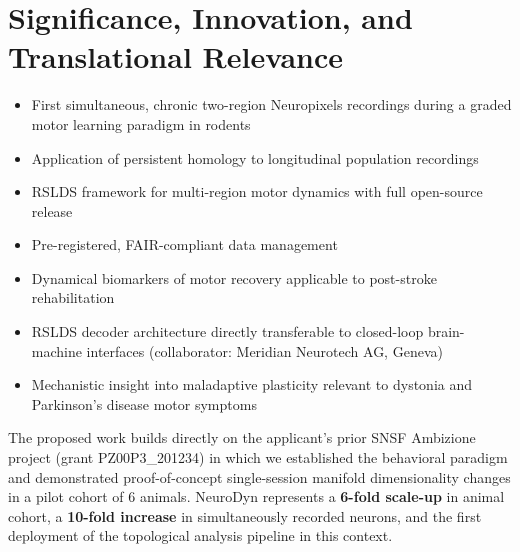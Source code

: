\section{Significance, Innovation, and Translational Relevance}

\begin{minipage}[t]{0.47\linewidth}
  \begin{tcolorbox}[snsfsidebar, title={\color{SNSFnavy}\bfseries\faLightbulb\quad Novelty}]
    \begin{itemize}[leftmargin=12pt, itemsep=3pt, topsep=2pt]
      \item First simultaneous, chronic two-region Neuropixels recordings during a graded motor
        learning paradigm in rodents
      \item Application of persistent homology to longitudinal population recordings
      \item RSLDS framework for multi-region motor dynamics with full open-source release
      \item Pre-registered, FAIR-compliant data management
    \end{itemize}
  \end{tcolorbox}
\end{minipage}\hfill
\begin{minipage}[t]{0.47\linewidth}
  \begin{tcolorbox}[snsfsidebar, title={\color{SNSFnavy}\bfseries\faHeartbeat\quad Clinical Impact}]
    \begin{itemize}[leftmargin=12pt, itemsep=3pt, topsep=2pt]
      \item Dynamical biomarkers of motor recovery applicable to post-stroke rehabilitation
      \item RSLDS decoder architecture directly transferable to closed-loop brain-machine
        interfaces (collaborator: Meridian Neurotech AG, Geneva)
      \item Mechanistic insight into maladaptive plasticity relevant to dystonia and
        Parkinson's disease motor symptoms
    \end{itemize}
  \end{tcolorbox}
\end{minipage}

\par
\vspace{6pt}

The proposed work builds directly on the applicant's prior SNSF Ambizione project (grant
PZ00P3\_201234) in which we established the behavioral paradigm and demonstrated proof-of-concept
single-session manifold dimensionality changes in a pilot cohort of 6 animals. NeuroDyn
represents a \textbf{6-fold scale-up} in animal cohort, a \textbf{10-fold increase} in
simultaneously recorded neurons, and the first deployment of the topological analysis pipeline
in this context.

\vspace{6pt}


